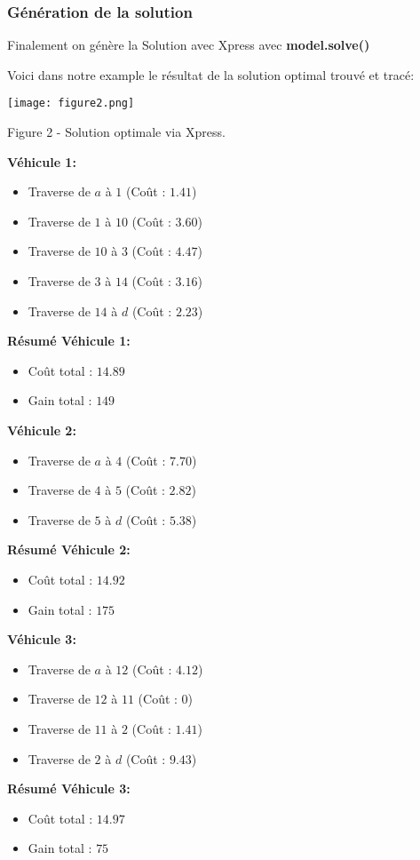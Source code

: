 \documentclass[a4paper, 12pt, DIV=12]{scrartcl}
\begin{document}
\subsubsection{Génération de la solution}
Finalement on génère la Solution avec Xpress avec \textbf{model.solve()} 

Voici dans notre example le résultat de la solution optimal trouvé et tracé:
\begin{center}
\texttt{[image: figure2.png]}

Figure 2 - Solution optimale via Xpress. 
\end{center}

\textbf{Véhicule 1:}
\begin{itemize}
    \item Traverse de $a$ à $1$ (Coût : $1.41$)
    \item Traverse de $1$ à $10$ (Coût : $3.60$)
    \item Traverse de $10$ à $3$ (Coût : $4.47$)
    \item Traverse de $3$ à $14$ (Coût : $3.16$)
    \item Traverse de $14$ à $d$ (Coût : $2.23$)
\end{itemize}
\textbf{Résumé Véhicule 1:}
\begin{itemize}
    \item Coût total : $14.89$
    \item Gain total : $149$\\
\end{itemize}

\textbf{Véhicule 2:}
\begin{itemize}
    \item Traverse de $a$ à $4$ (Coût : $7.70$)
    \item Traverse de $4$ à $5$ (Coût : $2.82$)
    \item Traverse de $5$ à $d$ (Coût : $5.38$)
\end{itemize}
\textbf{Résumé Véhicule 2:}
\begin{itemize}
    \item Coût total : $14.92$
    \item Gain total : $175$\\
\end{itemize}

\textbf{Véhicule 3:}
\begin{itemize}
    \item Traverse de $a$ à $12$ (Coût : $4.12$)
    \item Traverse de $12$ à $11$ (Coût : $0$)
    \item Traverse de $11$ à $2$ (Coût : $1.41$)
    \item Traverse de $2$ à $d$ (Coût : $9.43$)
\end{itemize}
\textbf{Résumé Véhicule 3:}
\begin{itemize}
    \item Coût total : $14.97$
    \item Gain total : $75$\\
\end{itemize}
\end{document}
